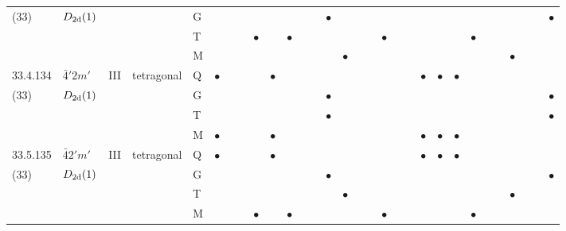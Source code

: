 \documentclass[fleqn,9pt,landscape]{jsarticle}
\begin{document}
\begin{longtable}{lllll|l|lll|ll|lll|l|lll|lll|l|ll|lll|lll}
(33) & $D_{\rm 2d}(1)$ &  &  & G &  &  &  &  &  &  &  &  & $\bullet$ &  &  &  &  &  &  &  &  &  &  &  &  &  &  &  & $\bullet$ \\
 &  &  &  & T &  &  &  & $\bullet$ &  & $\bullet$ &  &  &  &  &  &  & $\bullet$ &  &  &  &  &  & $\bullet$ &  &  &  &  &  &  \\
 &  &  &  & M &  &  &  &  &  &  &  &  &  & $\bullet$ &  &  &  &  &  &  &  &  &  &  &  & $\bullet$ &  &  &  \\ \hline
33.4.134 & \texttt{$\bar{4}'2m'$} & III & tetragonal & Q & $\bullet$ &  &  &  & $\bullet$ &  &  &  &  &  &  &  &  &  &  & $\bullet$ & $\bullet$ & $\bullet$ &  &  &  &  &  &  &  \\
(33) & $D_{\rm 2d}(1)$ &  &  & G &  &  &  &  &  &  &  &  & $\bullet$ &  &  &  &  &  &  &  &  &  &  &  &  &  &  &  & $\bullet$ \\
 &  &  &  & T &  &  &  &  &  &  &  &  & $\bullet$ &  &  &  &  &  &  &  &  &  &  &  &  &  &  &  & $\bullet$ \\
 &  &  &  & M & $\bullet$ &  &  &  & $\bullet$ &  &  &  &  &  &  &  &  &  &  & $\bullet$ & $\bullet$ & $\bullet$ &  &  &  &  &  &  &  \\ \hline
33.5.135 & \texttt{$\bar{4}2'm'$} & III & tetragonal & Q & $\bullet$ &  &  &  & $\bullet$ &  &  &  &  &  &  &  &  &  &  & $\bullet$ & $\bullet$ & $\bullet$ &  &  &  &  &  &  &  \\
(33) & $D_{\rm 2d}(1)$ &  &  & G &  &  &  &  &  &  &  &  & $\bullet$ &  &  &  &  &  &  &  &  &  &  &  &  &  &  &  & $\bullet$ \\
 &  &  &  & T &  &  &  &  &  &  &  &  &  & $\bullet$ &  &  &  &  &  &  &  &  &  &  &  & $\bullet$ &  &  &  \\
 &  &  &  & M &  &  &  & $\bullet$ &  & $\bullet$ &  &  &  &  &  &  & $\bullet$ &  &  &  &  &  & $\bullet$ &  &  &  &  &  &  \\
\end{longtable}
\renewcommand{\arraystretch}{1.6}
\end{document}

